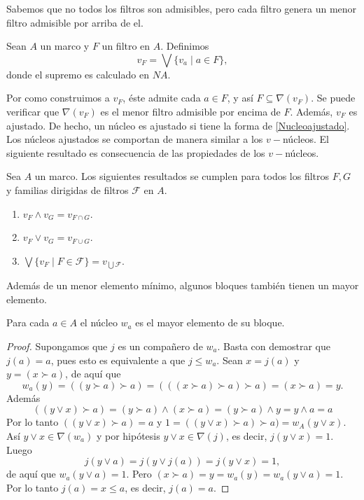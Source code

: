 Sabemos que no todos los filtros son admisibles, pero cada filtro genera un menor filtro admisible por arriba de el.

\begin{dfn}\label{Definicion5.5.6}
    Sean $A$ un marco y $F$ un filtro en $A$. Definimos 
    \begin{equation}\label{Nucleoajustado}
    v_F=\bigvee\{v_a\mid a\in F\},
    \end{equation}
    donde el supremo es calculado en $NA$.
\end{dfn}

Por como construimos a $v_F$, éste admite cada $a\in F$, y así $F\subseteq \nabla(v_F)$. Se puede verificar que $\nabla(v_F)$ es el menor filtro admisible por encima de $F$. Además, $v_F$ es ajustado. De hecho, un núcleo es ajustado si tiene la forma de \ref{Nucleoajustado}.\\

Los núcleos ajustados se comportan de manera similar a los $v-$núcleos. El siguiente resultado es consecuencia de las propiedades de los $v-$núcleos.

\begin{lem}\label{Lema5.5.7}
    Sea $A$ un marco. Los siguientes resultados se cumplen para todos los filtros $F, G$ y familias dirigidas de filtros $\mathcal{F}$ en $A$.
    \begin{enumerate}[$i) $]
        \item $v_F\wedge v_G=v_{F\cap G}$.
        \item $v_F\vee v_G=v_{F\cup G}$.
        \item $\bigvee\{v_F\mid F\in \mathcal{F}\}=v_{\bigcup \mathcal{F}}$.
    \end{enumerate}
\end{lem}

Además de un menor elemento mínimo, algunos bloques también tienen un mayor elemento.

\begin{lem}\label{Lema5.5.8}
    Para cada $a\in A$ el núcleo $w_a$ es el mayor elemento de su bloque.
\end{lem}

\begin{proof}
    Supongamos que $j$ es un compañero de $w_a$. Basta con demostrar que $j(a)=a$, pues esto es equivalente a que $j\leq w_a$. Sean $x=j(a)$ y $y=(x\succ a)$, de aquí que 
    \[
    w_a(y)=((y\succ a)\succ a)=(((x\succ a)\succ a)\succ a)=(x\succ a)=y.
    \]
    Además
    \[
    ((y\vee x)\succ a)=(y\succ a)\wedge (x\succ a)=(y\succ a)\wedge y=y\wedge a=a
    \]
    Por lo tanto $((y\vee x)\succ a)=a$ y $1=((y\vee x)\succ a)\succ a)=w_A(y\vee x)$. Así $y\vee x\in \nabla(w_a)$ y por hipótesis $y\vee x\in \nabla (j)$, es decir, $j(y\vee x)=1$.\\
    Luego 
    \[
    j(y\vee a)=j(y\vee j(a))=j(y\vee x)=1,
    \]
    de aquí que $w_a(y\vee a)=1$. Pero $(x\succ a)=y=w_a(y)=w_a(y\vee a)=1$. Por lo tanto $j(a)=x\leq a$, es decir, $j(a)=a$.
\end{proof}

